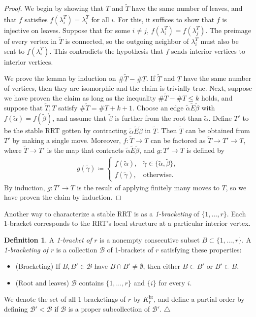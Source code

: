 \documentclass[11pt]{amsart}
\theoremstyle{definition}
\newtheorem{definition}[theorem]{Definition}
\theoremstyle{remark}
\theoremstyle{plain}
\newcommand{\sB}{\mathscr{B}}
\newcommand{\on}{\operatorname}
\newcommand{\br}{{\on{br}}}
\newcommand{\wt}{\widetilde}
\begin{document}
\begin{proof}
We begin by showing that $T$ and $\wt T$ have the same number of leaves, and that $f$ satisfies $f(\lambda_i^T) = \lambda_i^{\wt T}$ for all $i$.
For this, it suffices to show that $f$ is injective on leaves.
Suppose that for some $i \neq j$, $f(\lambda_i^T) = f(\lambda_j^T)$.
The preimage of every vertex in $\wt T$ is connected, so the outgoing neighbor of $\lambda_i^T$ must also be sent to $f(\lambda_i^T)$.
This contradicts the hypothesis that $f$ sends interior vertices to interior vertices.

We prove the lemma by induction on $\#\!\wt T - \#\!T$.
If $\wt T$ and $T$ have the same number of vertices, then they are isomorphic and the claim is trivially true.
Next, suppose we have proven the claim as long as the inequality $\#\!\wt T - \#\!T \leq k$ holds, and suppose that $\wt T, T$ satisfy $\#\!\wt T = \#\!T + k+1$.
Choose an edge $\wt\alpha \wt E\wt\beta$ with $f(\wt\alpha)=f(\wt\beta)$, and assume that $\wt\beta$ is further from the root than $\wt\alpha$.
Define $T'$ to be the stable RRT gotten by contracting $\wt\alpha\wt E\wt\beta$ in $\wt T$.
Then $\wt T$ can be obtained from $T'$ by making a single move.
Moreover, $f\colon \wt T \to T$ can be factored as $\wt T \to T' \to T$, where $\wt T \to T'$ is the map that contracts $\wt\alpha\wt E\wt\beta$, and $g\colon T' \to T$ is defined by
\begin{align}
g(\wt\gamma) \coloneqq \begin{cases}
f(\wt\alpha), & \wt\gamma \in \{\wt\alpha,\wt\beta\}, \\
f(\wt\gamma), & \text{otherwise}.	
 \end{cases}
\end{align}
By induction, $g\colon T' \to T$ is the result of applying finitely many moves to $T$, so we have proven the claim by induction.
\end{proof}

Another way to characterize a stable RRT is as a \emph{1-bracketing} of $\{1,\ldots,r\}$.
Each 1-bracket corresponds to the RRT's local structure at a particular interior vertex.

\begin{definition}
\label{def:Krbr}
A \emph{1-bracket of $r$} is a nonempty consecutive subset $B \subset \{1,\ldots,r\}$. \label{p:B}
A \emph{1-bracketing of $r$} is a collection $\sB$\label{p:sB} of 1-brackets of $r$ satisfying these properties:
\begin{itemize}
\item[] {\sc (Bracketing)} If $B, B' \in \sB$ have $B \cap B' \neq \emptyset$, then either $B \subset B'$ or $B' \subset B$.

\item[] {\sc (Root and leaves)} $\sB$ contains $\{1,\ldots,r\}$ and $\{i\}$ for every $i$.
\end{itemize}
We denote the set of all 1-bracketings of $r$ by $K_r^\br$,\label{p:Krbr} and define a partial order by defining $\sB' < \sB$ if $\sB$ is a proper subcollection of $\sB'$.
\null\hfill$\triangle$
\end{definition}
\end{document}
